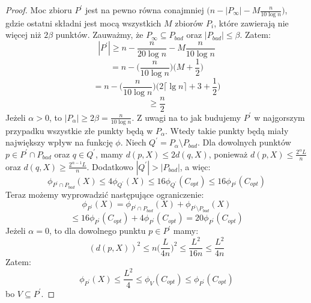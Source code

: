 \begin{proof}
    Moc zbioru $P^{'}$ jest na pewno równa conajmniej $\Big(n - |P_{\infty}| - M\frac{n}{10 \log n} \Big)$, gdzie ostatni składni jest mocą wszystkich $M$ zbiorów $P_{i}$, które zawierają nie więcej niż $2\beta$ punktów.
    Zauważmy, że $P_{\infty} \subseteq P_{bad}$ oraz $|P_{bad}| \leq \beta$.
    Zatem:
    \begin{equation}
        |P^{'}| \geq n - \frac{n}{20 \log n} - M \frac{n}{10 \log n}
    \end{equation}
    \begin{equation}
        = n - \Big(\frac{n}{10 \log n}\Big) \Big(M + \frac{1}{2}\Big)
    \end{equation}
    \begin{equation}
        = n - \Big(\frac{n}{10 \log n}\Big) \Big(2 \lceil \lg n \rceil + 3 + \frac{1}{2}\Big)
    \end{equation}
    \begin{equation}
        \geq \frac{n}{2}
    \end{equation}
    Jeżeli $\alpha > 0$, to $|P_{\alpha}| \geq 2\beta = \frac{n}{10 \log n}$.
    Z uwagi na to jak budujemy $P^{'}$ w najgorszym przypadku wszystkie złe punkty będą w $P_{\alpha}$.
    Wtedy takie punkty będą miały największy wpływ na funkcję $\phi$.
    Niech $Q^{'} = P_{\alpha} \setminus P_{bad}$.
    Dla dowolnych punktów $p \in P^{'} \cap P_{bad}$ oraz $q \in Q^{'}$, mamy $d(p, X) \leq 2d(q,X)$, ponieważ $d(p, X) \leq \frac{2^{\alpha}L}{n}$ oraz $d(q, X) \geq \frac{2^{\alpha-1}L}{n}$.
    Dodatkowo $|Q^{'}| > |P_{bad}|$, a więc:
    \begin{equation}
        \phi_{P^{'} \cap P_{bad}}(X) \leq 4\phi_{Q^{'}}(X) \leq 16\phi_{Q^{'}}(C_{opt}) \leq 16\phi_{P^{'}}(C_{opt})
    \end{equation}
    Teraz możemy wyprowadzić następujące ograniczenie:
    \begin{equation}
        \phi_{P^{'}}(X) = \phi_{P^{'} \cap P_{bad}}(X) + \phi_{P^{'} \setminus P_{bad}}(X)
    \end{equation}
    \begin{equation}
        \leq 16\phi_{P^{'}}(C_{opt}) + 4\phi_{P^{'}}(C_{opt}) = 20\phi_{P^{'}}(C_{opt})
    \end{equation}
    Jeżeli $\alpha = 0$, to dla dowolnego punktu $p \in P^{'}$ mamy:
    \begin{equation}
        (d(p,X))^2 \leq n\Big(\frac{L}{4n}\Big)^2 \leq \frac{L^{2}}{16n} \leq \frac{L^{2}}{4n}
    \end{equation}
    Zatem:
    \begin{equation}
        \phi_{P^{'}}(X) \leq \frac{L^{2}}{4} \leq \phi_{V}(C_{opt}) \leq \phi_{P^{'}}(C_{opt})
    \end{equation}
    bo $V \subseteq P^{'}$.
\end{proof}


